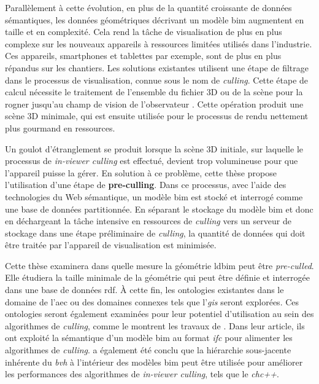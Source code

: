\begin{refsection}
\begin{multicols}{2}
        Parallèlement à cette évolution, en plus de la  quantité croissante de données sémantiques, les données géométriques décrivant un modèle \ac{bim} augmentent en taille et en complexité. Cela rend la tâche de visualisation de plus en plus complexe sur les nouveaux appareils à ressources limitées utilisés dans l'industrie. Ces appareils, smartphones et tablettes par exemple, sont de plus en plus répandus sur les chantiers. Les solutions existantes utilisent une étape de filtrage dans le processus de visualisation, connue sous le nom de \emph{culling}. Cette étape de calcul nécessite le traitement de l'ensemble du fichier 3D ou de la scène pour la rogner jusqu'au champ de vision de l'observateur \parencite{Johansson2015}. Cette opération produit une scène 3D minimale, qui est ensuite utilisée pour le processus de rendu nettement plus gourmand en ressources.

        Un goulot d'étranglement se produit lorsque la scène 3D initiale, sur laquelle le processus de \emph{in-viewer culling} est effectué, devient trop volumineuse pour que l'appareil puisse la gérer. En solution à ce problème, cette thèse propose l'utilisation d'une étape de \textbf{pre-culling}. Dans ce processus, avec l'aide des technologies du Web sémantique, un modèle \ac{bim} est stocké et interrogé comme une base de données partitionnée. En séparant le stockage du modèle \ac{bim} et donc en déchargeant la tâche intensive en ressources de \emph{culling} vers un serveur de stockage dans une étape préliminaire de \emph{culling}, la quantité de données qui doit être traitée par l'appareil de visualisation est minimisée.

        Cette thèse examinera dans quelle mesure la géométrie \ac{ldbim} peut être \emph{pre-culled}. Elle étudiera la taille minimale de la géométrie qui peut être définie et interrogée dans une base de données \ac{rdf}. À cette fin, les ontologies existantes dans le domaine de l'\ac{aec} ou des domaines connexes tels que l'\emph{\ac{gis}} seront explorées. Ces ontologies seront également examinées pour leur potentiel d'utilisation au sein des algorithmes de \emph{culling}, comme le montrent les travaux de \cite{Johansson2009}. Dans leur article, ils ont exploité la sémantique d'un modèle \ac{bim} au format \emph{\ac{ifc}} pour alimenter les algorithmes de \emph{culling}. \cite{Johansson2015} a également été conclu que la hiérarchie sous-jacente inhérente du \emph{\ac{bvh}} à l'intérieur des modèles \ac{bim} peut être utilisée pour améliorer les performances des algorithmes de \emph{in-viewer culling}, tels que le \emph{\ac{chc}++}.


\end{multicols}
\end{refsection}
